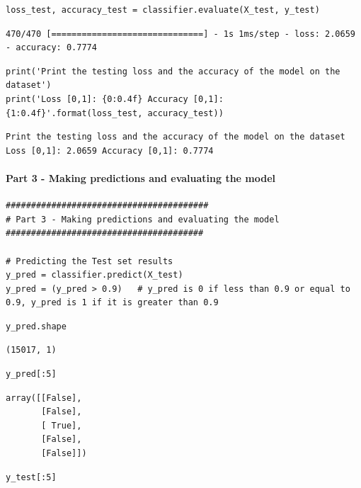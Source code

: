 \begin{verbatim}
loss_test, accuracy_test = classifier.evaluate(X_test, y_test)
\end{verbatim}

\begin{verbatim}
470/470 [==============================] - 1s 1ms/step - loss: 2.0659 - accuracy: 0.7774
\end{verbatim}

\begin{verbatim}
print('Print the testing loss and the accuracy of the model on the dataset')
print('Loss [0,1]: {0:0.4f} Accuracy [0,1]: {1:0.4f}'.format(loss_test, accuracy_test))
\end{verbatim}

\begin{verbatim}
Print the testing loss and the accuracy of the model on the dataset
Loss [0,1]: 2.0659 Accuracy [0,1]: 0.7774
\end{verbatim}

\paragraph{Part 3 - Making predictions and evaluating the model}

\begin{verbatim}
########################################
# Part 3 - Making predictions and evaluating the model
#######################################

# Predicting the Test set results
y_pred = classifier.predict(X_test)
y_pred = (y_pred > 0.9)   # y_pred is 0 if less than 0.9 or equal to 0.9, y_pred is 1 if it is greater than 0.9
\end{verbatim}

\begin{verbatim}
y_pred.shape
\end{verbatim}

\begin{verbatim}
(15017, 1)
\end{verbatim}

\begin{verbatim}
y_pred[:5]
\end{verbatim}

\begin{verbatim}
array([[False],
       [False],
       [ True],
       [False],
       [False]])
\end{verbatim}

\begin{verbatim}
y_test[:5]
\end{verbatim}

